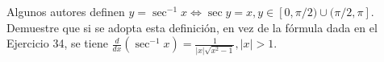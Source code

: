 \item Algunos autores definen $y = \sec^{-1} x \iff \sec y = x, y \in [0, \pi/2) \cup (\pi/2, \pi]$. Demuestre que si se adopta esta definición, en vez de la fórmula dada en el Ejercicio 34, se tiene $\frac{d}{dx}(\sec^{-1} x) = \frac{1}{|x|\sqrt{x^2-1}}, |x|>1$.
